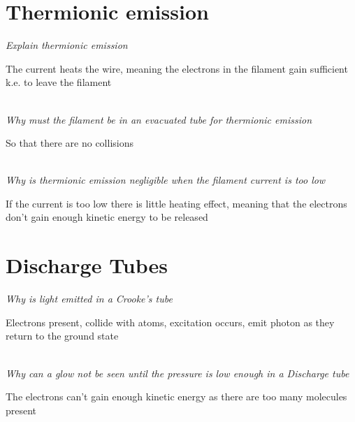 \documentclass[12pt]{article}
\begin{document}
\section{Thermionic emission}
\textit{Explain thermionic emission}
\begin{center}
The current heats the wire, meaning the electrons in the filament gain sufficient k.e. to leave the filament
\end{center}
$ $\\
\textit{Why must the filament be in an evacuated tube for thermionic emission}
\begin{center}
So that there are no collisions
\end{center}
$ $\\
\textit{Why is thermionic emission negligible when the filament current is too low}
\begin{center}
If the current is too low there is little heating effect, meaning that the electrons don't gain enough kinetic energy to be released
\end{center}
\section{Discharge Tubes}
\textit{Why is light emitted in a Crooke's tube}
\begin{center}
Electrons present, collide with atoms, excitation occurs, emit photon as they return to the ground state
\end{center}
$ $\\
\textit{Why can a glow not be seen until the pressure is low enough in a Discharge tube}
\begin{center}
The electrons can't gain enough kinetic energy as there are too many molecules present
\end{center}
$ $\\
\end{document}
